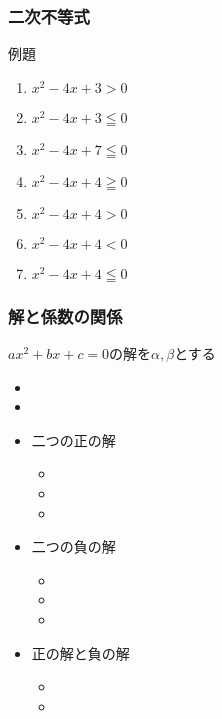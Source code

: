 \documentclass[10pt,dvipdfmx]{jsarticle}
\begin{document}
\subsubsection*{二次不等式}
\begin{itembox}[l]{例題}
  \begin{large}
    \begin{multicols}{2}
      \begin{enumerate}
        \item $x^2-4x+3>0$
        \item $x^2-4x+3\leqq0$
        \item $x^2-4x+7\leqq0$
        \item $x^2-4x+4\geqq0$
        \item $x^2-4x+4>0$
        \item  $x^2-4x+4<0$
        \item $x^2-4x+4\leqq0$
      \end{enumerate}
    \end{multicols}
  \end{large}

\end{itembox}

\subsubsection*{解と係数の関係}
$ax^2+bx+c=0$の解を$\alpha,\beta$とする
\begin{multicols}{2}
  \begin{itemize}
    \item \item
  \end{itemize}
\end{multicols}

\begin{multicols}{3}
  \begin{large}
    \begin{itemize}
      \item 二つの正の解
            \begin{itemize}
              \item \item \item
            \end{itemize}
      \item 二つの負の解
            \begin{itemize}
              \item \item \item
            \end{itemize}
      \item 正の解と負の解
            \begin{itemize}
              \item \item
            \end{itemize}
    \end{itemize}
  \end{large}
\end{multicols}
\end{document}
